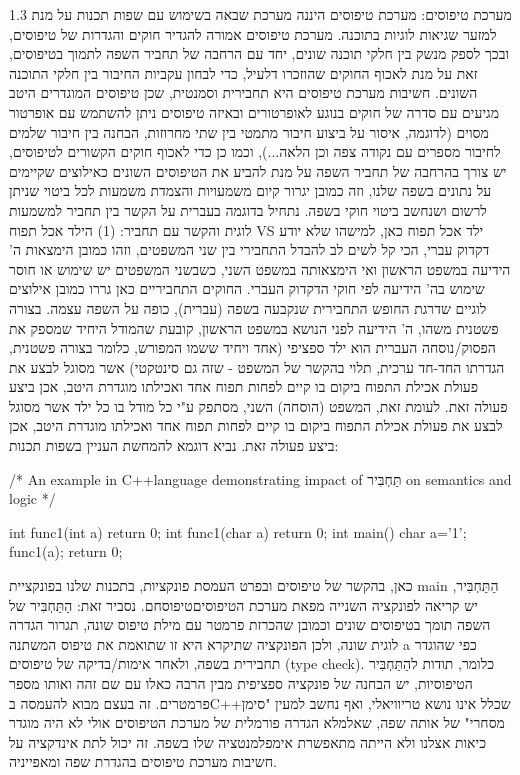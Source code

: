       1.3 מערכת טיפוסים:
      מערכת טיפוסים היננה מערכת שבאה בשימוש עם שפות תכנות על מנת למזער שגיאות לוגיות
      בתוכנה. מערכת טיפוסים אמורה להגדיר חוקים והגדרות של טיפוסים, ובכך לספק מנשק בין
      חלקי תוכנה שונים, יחד עם הרחבה של תחביר השפה לתמוך בטיפוסים, זאת על מנת לאכוף
      החוקים שהוזכרו דלעיל, כדי לבחון עקביות החיבור בין חלקי התוכנה השונים. חשיבות
      מערכת טיפוסים היא תחבירית וסמנטית, שכן טיפוסים המוגדרים היטב מגיעים עם סדרה של
      חוקים בנוגע לאופרטורים ובאיזה טיפוסים ניתן להשתמש עם אופרטור מסוים (לדוגמה,
      איסור על ביצוע חיבור מתמטי בין שתי מחרוזות, הבחנה בין חיבור שלמים לחיבור מספרים
      עם נקודה צפה וכן הלאה...), וכמו כן כדי לאכוף חוקים הקשורים לטיפוסים, יש צורך
      בהרחבה של תחביר השפה על מנת להביע את הטיפוסים השונים כאילוצים שקיימים על נתונים
      בשפה שלנו, וזה כמובן יגרור קיום משמעויות והצמדת משמעות לכל ביטוי שניתן לרשום
      ושנחשב ביטוי חוקי בשפה. נתחיל בדוגמה בעברית על הקשר בין תחביר למשמעות לוגית
      והקשר עם תחביר:
      (1) הילד אכל תפוח VS ילד אכל תפוח כאן, למישהו שלא יודע דקדוק עברי, הכי
      קל לשים לב להבדל התחבירי בין שני המשפטים, וזהו כמובן הימצאות ה' הידיעה במשפט
      הראשון ואי הימצאותה במשפט השני, כשבשני המשפטים יש שימוש או חוסר שימוש בה'
      הידיעה לפי חוקי הדקדוק העברי. החוקים התחביריים כאן גררו כמובן אילוצים לוגיים
      שדרגת החופש התחבירית שנקבעה בשפה (עברית), כופה על השפה עצמה. בצורה פשטנית משהו,
      ה' הידיעה לפני הנושא במשפט הראשון, קובעת שהמודל היחיד שמספק את הפסוק/נוסחה
      העברית הוא ילד ספציפי (אחד ויחיד ששמו המפורש, כלומר בצורה פשטנית, הגדרתו החד-חד
      ערכית, תלוי בהקשר של המשפט - שזה גם סינטקטי) אשר מסוגל לבצע את פעולת אכילת
      התפוח ביקום בו קיים לפחות תפוח אחד ואכילתו מוגדרת היטב, אכן ביצע פעולה זאת.
      לעומת זאת, המשפט (הוסחה) השני, מסתפק ע"י כל מודל בו כל ילד אשר מסוגל לבצע את
      פעולת אכילת התפוח ביקום בו קיים לפחות תפוח אחד ואכילתו מוגדרת היטב, אכן ביצע
      פעולה זאת.
      נביא דוגמא להמחשת העניין בשפות תכנות:
\begin{CPP}
/* An example in C++language demonstrating impact of תַּחְבִּיר on semantics and logic */

int func1(int a) {
  return 0;
}
int func1(char a) {
  return 0;
}
int main() {
  char a='1';
  func1(a);
  return 0;
}
\end{CPP}

      כאן, בהקשר של טיפוסים ובפרט העמסת פונקציות, בתכנות שלנו בפונקציית main הַתַּחְבִּיר,
      יש קריאה לפונקציה השנייה מפאת מערכת הטיפוסיםטיפוסחם. נסביר זאת: הַתַּחְבִּיר של השפה
      תומך בטיפוסים שונים וכמובן שהכרזת פרמטר עם מילת טיפוס שונה, תגרור הגדרה לוגית
      שונה, ולכן הפונקציה שתיקרא היא זו שתואמת את טיפוס המשתנה a כפי שהוגדר תחבירית
      בשפה, ולאחר אימות/בדיקה של טיפוסים (type check). כלומר, תודות להַתַּחְבִּיר
      הטיפוסיות, יש הבחנה של פונקציה ספציפית מבין הרבה כאלו עם שם זהה ואותו מספר
      פרמטרים. זה בעצם מבוא להעמסה בC++שכלל אינו נושא טריוויאלי, ואף נחשב למעין
      "סימן מסחרי" של אותה שפה, שאלמלא הגדרה פורמלית של מערכת הטיפוסים אולי לא היה
      מוגדר כיאות אצלנו ולא הייתה מתאפשרת אימפלמנטציה שלו בשפה. זה יכול לתת אינדקציה
      על חשיבות מערכת טיפוסים בהגדרת שפה ומאפייניה.


